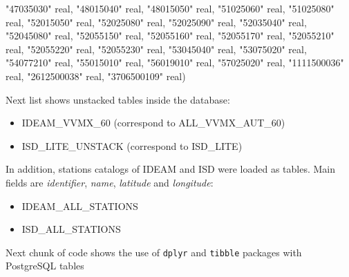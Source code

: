\documentclass[12pt,twoside]{reedthesis}
\newenvironment{Shaded}{\begin{snugshade}}{\end{snugshade}}
\newcommand{\DataTypeTok}[1]{\textcolor[rgb]{0.13,0.29,0.53}{#1}}
\newcommand{\NormalTok}[1]{#1}
\newcommand{\OtherTok}[1]{\textcolor[rgb]{0.56,0.35,0.01}{#1}}
\providecommand{\tightlist}{%
  \setlength{\itemsep}{0pt}\setlength{\parskip}{0pt}}
\begin{document}
\begin{Shaded}
\begin{Highlighting}[]
     \OtherTok{"47035030"} \DataTypeTok{real}\NormalTok{, }\OtherTok{"48015040"} \DataTypeTok{real}\NormalTok{, }\OtherTok{"48015050"} \DataTypeTok{real}\NormalTok{, }\OtherTok{"51025060"} \DataTypeTok{real}\NormalTok{, }\OtherTok{"51025080"} \DataTypeTok{real}\NormalTok{, }\OtherTok{"52015050"} \DataTypeTok{real}\NormalTok{, }
     \OtherTok{"52025080"} \DataTypeTok{real}\NormalTok{, }\OtherTok{"52025090"} \DataTypeTok{real}\NormalTok{, }\OtherTok{"52035040"} \DataTypeTok{real}\NormalTok{, }\OtherTok{"52045080"} \DataTypeTok{real}\NormalTok{, }\OtherTok{"52055150"} \DataTypeTok{real}\NormalTok{, }\OtherTok{"52055160"} \DataTypeTok{real}\NormalTok{, }
     \OtherTok{"52055170"} \DataTypeTok{real}\NormalTok{, }\OtherTok{"52055210"} \DataTypeTok{real}\NormalTok{, }\OtherTok{"52055220"} \DataTypeTok{real}\NormalTok{, }\OtherTok{"52055230"} \DataTypeTok{real}\NormalTok{, }\OtherTok{"53045040"} \DataTypeTok{real}\NormalTok{, }\OtherTok{"53075020"} \DataTypeTok{real}\NormalTok{, }
     \OtherTok{"54077210"} \DataTypeTok{real}\NormalTok{, }\OtherTok{"55015010"} \DataTypeTok{real}\NormalTok{, }\OtherTok{"56019010"} \DataTypeTok{real}\NormalTok{, }\OtherTok{"57025020"} \DataTypeTok{real}\NormalTok{, }\OtherTok{"1111500036"} \DataTypeTok{real}\NormalTok{,}
     \OtherTok{"2612500038"} \DataTypeTok{real}\NormalTok{, }\OtherTok{"3706500109"} \DataTypeTok{real}\NormalTok{)}
\end{Highlighting}
\end{Shaded}
\normalsize

Next list shows unstacked tables inside the database:
\begin{itemize}
\tightlist
\item
  IDEAM\_VVMX\_60 (correspond to ALL\_VVMX\_AUT\_60)
\item
  ISD\_LITE\_UNSTACK (correspond to ISD\_LITE)
\end{itemize}
In addition, stations catalogs of IDEAM and ISD were loaded as tables. Main fields are \emph{identifier}, \emph{name}, \emph{latitude} and \emph{longitude}:
\begin{itemize}
\tightlist
\item
  IDEAM\_ALL\_STATIONS
\item
  ISD\_ALL\_STATIONS
\end{itemize}
Next chunk of code shows the use of \texttt{dplyr} and \texttt{tibble} packages with PostgreSQL tables

\scriptsize
\end{document}
